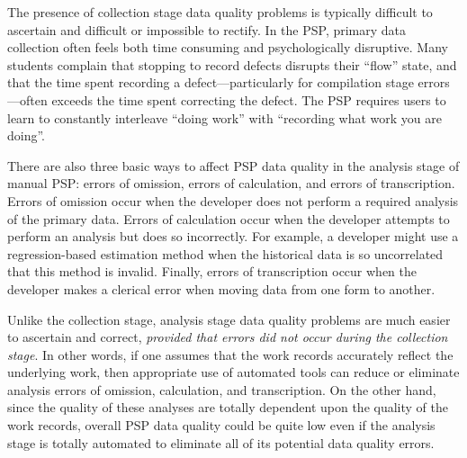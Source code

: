 The presence of collection stage data quality problems is typically
difficult to ascertain and difficult or impossible to rectify. In the
PSP, primary data collection often feels both time consuming and
psychologically disruptive.  Many students complain that stopping to record
defects disrupts their ``flow'' state, and that the time spent recording a
defect---particularly for compilation stage errors---often exceeds the time
spent correcting the defect.  The PSP requires users to learn to constantly
interleave ``doing work'' with ``recording what work you are doing''.

There are also three basic ways to affect PSP data quality in the analysis
stage of manual PSP: errors of omission, errors of calculation, and errors of
transcription.  Errors of omission occur when the developer does not
perform a required analysis of the primary data. Errors of calculation
occur when the developer attempts to perform an analysis but does so
incorrectly. For example, a developer might use a regression-based
estimation method when the historical data is so uncorrelated that this
method is invalid. Finally, errors of transcription occur when the
developer makes a clerical error when moving data from one form to another.

Unlike the collection stage, analysis stage data quality problems are much
easier to ascertain and correct, {\em provided that errors did not occur
  during the collection stage}.  In other words, if one assumes that the
work records accurately reflect the underlying work, then appropriate use
of automated tools can reduce or eliminate analysis errors of
omission, calculation, and transcription.  On the other hand, since the
quality of these analyses are totally dependent upon the quality of the
work records, overall PSP data quality could be quite low even if the
analysis stage is totally automated to eliminate all of its potential data
quality errors.







